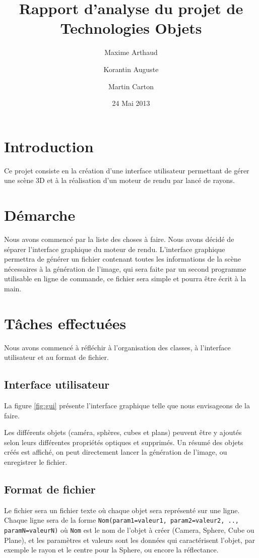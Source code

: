 \documentclass[a4paper]{article}
\title{Rapport d'analyse du projet de Technologies Objets}
\author{Maxime Arthaud \and Korantin Auguste \and Martin Carton}
\date{24 Mai 2013}
\begin{document}
\maketitle

\section{Introduction}
  Ce projet consiste en la création d'une interface utilisateur permettant de
  gérer une scène 3D et à la réalisation d'un moteur de rendu par lancé de
  rayons.

\section{Démarche}
  Nous avons commencé par la liste des choses à faire. Nous avons décidé
  de séparer l'interface graphique du moteur de rendu. L'interface
  graphique permettra de générer un fichier contenant toutes les informations
  de la scène nécessaires à la génération de l'image, qui sera faite par un
  second programme utilisable en ligne de commande, ce fichier sera simple et
  pourra être écrit à la main.

\section{Tâches effectuées}
  Nous avons commencé à réfléchir à l'organisation des classes, à l'interface
  utilisateur et au format de fichier.

  \subsection{Interface utilisateur}
    La figure \ref{fig:gui} présente l'interface graphique telle que nous
    envisageons de la faire.

    Les différents objets (caméra,
    sphères, cubes et plans) peuvent être y ajoutés selon leurs différentes
    propriétés optiques et supprimés. Un résumé des objets créés est affiché, on
    peut directement lancer la génération de l'image, ou enregistrer le fichier.

  \subsection{Format de fichier}
    Le fichier sera un fichier texte où chaque objet sera représenté sur une
    ligne. Chaque ligne sera de la forme
    \verb+Nom(param1=valeur1, param2=valeur2, .., paramN=valeurN)+
    où \verb+Nom+ est le nom de l'objet à créer (Camera, Sphere, Cube ou
    Plane), et les paramètres et
    valeurs sont les données qui caractérisent l'objet, par exemple le rayon
    et le centre pour la Sphere, ou encore la réflectance.
\end{document}

